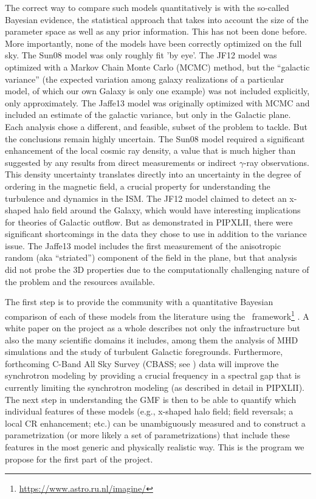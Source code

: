 The correct way to compare such models quantitatively is with the so-called Bayesian evidence, the statistical approach that takes into account the size of the parameter space as well as any prior information. This has not been done before. More importantly, none of the models have been correctly optimized on the full sky. The Sun08 model was only roughly fit 'by eye'. The JF12 model was optimized with a Markov Chain Monte Carlo (MCMC) method, but the ``galactic variance'' (the expected variation among galaxy realizations of a particular model, of which our own Galaxy is only one example) was not included explicitly, only approximately. The Jaffe13 model was originally optimized with MCMC and included an estimate of the galactic variance, but only in the Galactic plane. Each analysis chose a different, and feasible, subset of the problem to tackle. But the conclusions remain highly uncertain.  The Sun08 model required a significant enhancement of the local cosmic ray density, a value that is much higher than suggested by any results from direct measurements or indirect $\gamma$-ray observations. This density uncertainty translates directly into an uncertainty in the degree of ordering in the magnetic field, a crucial property for understanding the turbulence and dynamics in the ISM.  The JF12 model claimed to detect an x-shaped halo field around the Galaxy, which would have interesting implications for theories of Galactic outflow.  But as demonstrated in PIPXLII, there were significant shortcomings in the data they chose to use in addition to the variance issue. The Jaffe13 model includes the first measurement \citep{jaffe10} of the anisotropic random (aka ``striated'') component of the field in the plane, but that analysis did not probe the 3D properties due to the computationally challenging nature of the problem and the resources available. 

The first step is to provide the community with a quantitative Bayesian comparison of each of these models from the literature using the \imagineSW\ framework\footnote{\url{https://www.astro.ru.nl/imagine/}} \citep{imagineWP}.  A white paper on the project as a whole \citep{imagineWP} describes not only the infrastructure but also the many scientific domains it includes, among them the analysis of MHD simulations and the study of turbulent Galactic foregrounds.  Furthermore, forthcoming C-Band All Sky Survey (CBASS; see \citealt{cbass}) data will improve the synchrotron modeling by providing a crucial frequency in a spectral gap that  is currently limiting the synchrotron modeling  (as described in detail in PIPXLII).  The next step in understanding the GMF is then to be able to quantify which individual features of these models (e.g., x-shaped halo field; field reversals; a local CR enhancement; etc.) can be unambiguously measured and to construct a parametrization (or more likely a set of parametrizations) that include these features in the most generic and physically realistic way. This is the program we propose for the first part of the project. 


